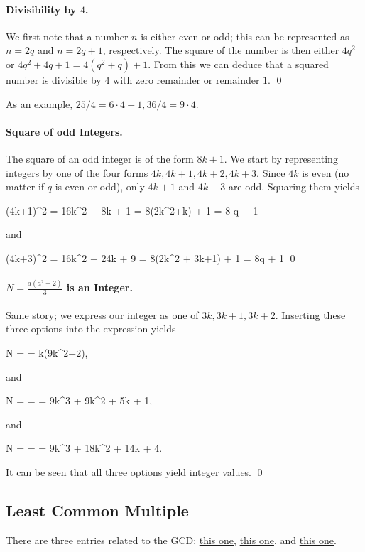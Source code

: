 \paragraph{Divisibility by $4$.} We first note that a number $n$ is either even or odd; this can be represented as $n = 2q$ and $n = 2q+1$, respectively. The square of the number is then either $4q^2$ or $4q^2 + 4q + 1 = 4(q^2+q) + 1$. From this we can deduce that a squared number is divisible by $4$ with zero remainder or remainder $1$. \qed

As an example, $25 / 4 = 6 \cdot 4 + 1, 36 / 4 = 9 \cdot 4$.

\paragraph{Square of odd Integers.} The square of an odd integer is of the form $8k+1$. We start by representing integers by one of the four forms $4k, 4k+1, 4k+2, 4k+3$. Since $4k$ is even (no matter if $q$ is even or odd), only $4k+1$ and $4k+3$ are odd. Squaring them yields

\bee
(4k+1)^2 = 16k^2 + 8k + 1 = 8(2k^2+k) + 1 = 8 q + 1
\eee

and

\bee
(4k+3)^2 = 16k^2 + 24k + 9 = 8(2k^2 + 3k+1) + 1 = 8q + 1 \qed
\eee

\paragraph{$N = \frac{a(a^2+2)}{3}$ is an Integer.} Same story; we express our integer as one of $3k, 3k+1, 3k+2$. Inserting these three options into the expression yields

\bee
N =  = k(9k^2+2),
\eee

and

\bee
N =  =  = 9k^3 + 9k^2 + 5k + 1,
\eee

and

\bee
N =  =  = 9k^3 + 18k^2 + 14k + 4.
\eee

It can be seen that all three options yield integer values. \qed

\subsection{Least Common Multiple}

There are three entries related to the GCD: \href{2017-04-26:entry}{this one}, \href{2017-05-01:entry}{this one}, and \href{2017-09-28:entry}{this one}.

